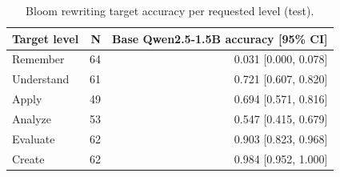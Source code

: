 \begin{table}[t]
\centering
\caption{Bloom rewriting target accuracy per requested level (test).}
\label{tab:t4_bloom_per_level}
\begin{tabular}{lrr}
\toprule
Target level & N & Base Qwen2.5-1.5B accuracy [95\% CI] \\
\midrule
Remember & 64 & 0.031 [0.000, 0.078] \\
Understand & 61 & 0.721 [0.607, 0.820] \\
Apply & 49 & 0.694 [0.571, 0.816] \\
Analyze & 53 & 0.547 [0.415, 0.679] \\
Evaluate & 62 & 0.903 [0.823, 0.968] \\
Create & 62 & 0.984 [0.952, 1.000] \\
\bottomrule
\end{tabular}
\end{table}

